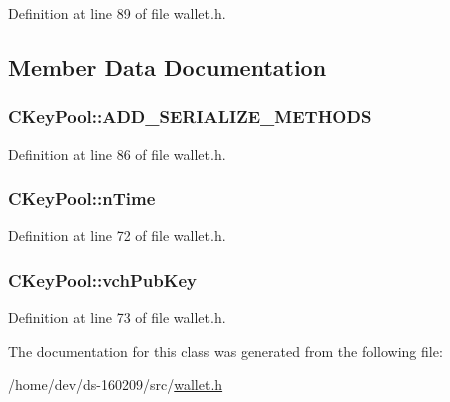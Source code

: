 Definition at line 89 of file wallet.\+h.



\subsection{Member Data Documentation}
\hypertarget{class_c_key_pool_ad4bc93c36031a3e6306c102008be5f51}{}
\subsubsection[{A\+D\+D\+\_\+\+S\+E\+R\+I\+A\+L\+I\+Z\+E\+\_\+\+M\+E\+T\+H\+O\+D\+S}]{\setlength{\rightskip}{0pt plus 5cm}C\+Key\+Pool\+::\+A\+D\+D\+\_\+\+S\+E\+R\+I\+A\+L\+I\+Z\+E\+\_\+\+M\+E\+T\+H\+O\+D\+S}\label{class_c_key_pool_ad4bc93c36031a3e6306c102008be5f51}


Definition at line 86 of file wallet.\+h.

\hypertarget{class_c_key_pool_aa2f8263f0baf732ad5b4e4b59b482209}{}
\subsubsection[{n\+Time}]{ C\+Key\+Pool\+::n\+Time}\label{class_c_key_pool_aa2f8263f0baf732ad5b4e4b59b482209}


Definition at line 72 of file wallet.\+h.

\hypertarget{class_c_key_pool_a937080a4cec1f2b138ebd200557c82b5}{}
\subsubsection[{vch\+Pub\+Key}]{ C\+Key\+Pool\+::vch\+Pub\+Key}\label{class_c_key_pool_a937080a4cec1f2b138ebd200557c82b5}


Definition at line 73 of file wallet.\+h.



The documentation for this class was generated from the following file\+:\begin{DoxyCompactItemize}
\item 
/home/dev/ds-\/160209/src/\hyperlink{wallet_8h}{wallet.\+h}\end{DoxyCompactItemize}
